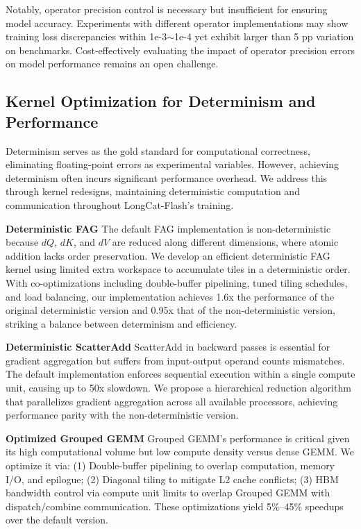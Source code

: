 \documentclass{article}
\newcommand{\longcat}{LongCat-Flash\xspace}
\begin{document}
Notably, operator precision control is necessary but insufficient for ensuring model accuracy. Experiments with different operator implementations may show training loss discrepancies within 1e-3$\sim$1e-4 yet exhibit larger than 5 pp variation on benchmarks. Cost-effectively evaluating the impact of operator precision errors on model performance remains an open challenge.

\subsection{Kernel Optimization for Determinism and Performance}
Determinism serves as the gold standard for computational correctness, eliminating floating-point errors as experimental variables. However, achieving determinism often incurs significant performance overhead. We address this through kernel redesigns, maintaining deterministic computation and communication throughout \longcat's training.

\textbf{Deterministic FAG} The default FAG implementation is non-deterministic because $dQ$, $dK$, and $dV$ are reduced along different dimensions, where atomic addition lacks order preservation. We develop an efficient deterministic FAG kernel using limited extra workspace to accumulate tiles in a deterministic order. With co-optimizations including double-buffer pipelining, tuned tiling schedules, and load balancing, our implementation achieves 1.6x the performance of the original deterministic version and 0.95x that of the non-deterministic version, striking a balance between determinism and efficiency.

\textbf{Deterministic ScatterAdd} ScatterAdd in backward passes is essential for gradient aggregation but suffers from input-output operand counts mismatches. The default implementation enforces sequential execution within a single compute unit, causing up to 50x slowdown. We propose a hierarchical reduction algorithm that parallelizes gradient aggregation across all available processors, achieving performance parity with the non-deterministic version.

\textbf{Optimized Grouped GEMM} Grouped GEMM's performance is critical given its high computational volume but low compute density versus dense GEMM. We optimize it via: (1) Double-buffer pipelining to overlap computation, memory I/O, and epilogue; (2) Diagonal tiling to mitigate L2 cache conflicts; (3) HBM bandwidth control via compute unit limits to overlap Grouped GEMM with dispatch/combine communication. These optimizations yield 5\%–45\% speedups over the default version.
\end{document}
